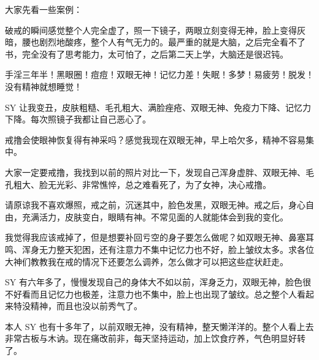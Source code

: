 大家先看一些案例：

\begin{case}[眼睛]
    破戒的瞬间感觉整个人完全虚了，照一下镜子，两眼立刻变得无神，脸上变得灰暗，腰也剧烈地酸疼，整个人有气无力的。最严重的就是大脑，之后完全看不了书，完全没有了思考能力，太可怕了，之后第二天上学，大脑还是很迟钝。
\end{case}

\begin{case}[眼睛]
    手淫三年半！黑眼圈！痘痘！双眼无神！记忆力差！失眠！多梦！易疲劳！脱发！没有精神就想睡觉！
\end{case}

\begin{case}[眼睛]
    SY 让我变丑，皮肤粗糙、毛孔粗大、满脸痤疮、双眼无神、免疫力下降、记忆力下降。每次照镜子我都让自己恶心了。
\end{case}

\begin{case}[眼睛]
    戒撸会使眼神恢复得有神采吗？感觉我现在双眼无神，早上哈欠多，精神不容易集中。
\end{case}

\begin{case}[眼睛]
    大家一定要戒撸，我找到以前的照片对比一下，发现自己浑身虚胖、双眼无神、毛孔粗大、脸无光彩、非常憔悴，总之难看死了，为了女神，决心戒撸。
\end{case}

\begin{case}[眼睛]
    请原谅我不喜欢爆照，戒之前，沉迷其中，脸色发黑，双眼无神。戒之后，身心自由，充满活力，皮肤变白，眼睛有神。不常见面的人就能体会到我的变化。
\end{case}

\begin{case}[眼睛]
    我觉得我应该戒掉了，但是想要补回亏空的身子要怎么做呢？如双眼无神、鼻塞耳鸣、浑身无力整天犯困，还有注意力不集中记忆力也不好，脸上皱纹太多。求各位大神们教教我在戒的情况下还要怎么调养，怎么做才可以把这些症状赶走。
\end{case}

\begin{case}[眼睛]
    SY 有六年多了，慢慢发现自己的身体大不如以前，浑身乏力，双眼无神，脸色很不好看而且记忆力也极差，注意力也不集中，脸上也出现了皱纹。总之整个人看起来特没精神，而且也没以前秀气了。
\end{case}

\begin{case}[眼睛]
    本人 SY 也有十多年了，以前双眼无神，没有精神，整天懒洋洋的。整个人看上去非常古板与木讷。现在痛改前非，每天坚持运动，加上饮食疗养，气色明显好转了。
\end{case}

